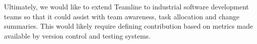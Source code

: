 \documentclass[../manifest.tex]{subfiles}
\begin{document}
Ultimately, we would like to extend Teamline to industrial software development teams so that it could assist with team awareness, task allocation and change summaries. This would likely require defining contribution based on metrics made available by version control and testing systems.




%
\end{document}
